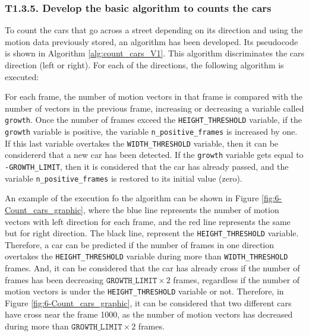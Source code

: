 \subsubsection{T1.3.5. Develop the basic algorithm to counts the cars}
To count the cars that go across a street depending on its direction and using the motion data previously stored, an algorithm has been developed. Its pseudocode is shown in Algorithm \ref{alg:count_cars_V1}. This algorithm discriminates the cars direction (left or right). For each of the directions, the following algorithm is executed: 

For each frame, the number of motion vectors in that frame is compared with the number of vectors in the previous frame, increasing or decreasing a variable called \texttt{growth}. Once the number of frames exceed the \texttt{HEIGHT\_THRESHOLD} variable, if the \texttt{growth} variable is positive, the variable \texttt{n\_positive\_frames} is increased by one. If this last variable overtakes the \texttt{WIDTH\_THRESHOLD} variable, then it can be considererd that a new car has been detected. If the \texttt{growth} variable gets equal to \texttt{-GROWTH\_LIMIT}, then it is considered that the car has already passed, and the variable \texttt{n\_positive\_frames} is restored to its initial value (zero).

An example of the execution fo the algorithm can be shown in Figure \ref{fig:6-Count_cars_graphic}, where the blue line represents the number of motion vectors with left direction for each frame, and the red line represents the same but for right direction. The black line, represent the \texttt{HEIGHT\_THRESHOLD} variable. Therefore, a car can be predicted if the number of frames in one direction overtakes the \texttt{HEIGHT\_THRESHOLD} variable during more than \texttt{WIDTH\_THRESHOLD} frames. And, it can be considered that the car has already cross if the number of frames has been decreasing $\texttt{GROWTH\_LIMIT} \times 2 $ frames, regardless if the number of motion vectors is under the \texttt{HEIGHT\_THRESHOLD} variable or not. Therefore, in Figure \ref{fig:6-Count_cars_graphic}, it can be considered that two different cars have cross near the frame 1000, as the number of motion vectors has decreased during more than $\texttt{GROWTH\_LIMIT} \times 2 $ frames.

